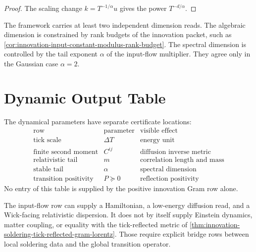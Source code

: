 \begin{proof}
The scaling change $k=T^{-1/\alpha}u$ gives the power
$T^{-d/\alpha}$.
\end{proof}

\begin{principle}
\label{prin:innovation-input-dynamics-dimension-split}
The framework carries at least two independent dimension reads. The
algebraic dimension is constrained by rank budgets of the innovation packet,
such as \autoref{cor:innovation-input-constant-modulus-rank-budget}. The
spectral dimension is controlled by the tail exponent $\alpha$ of the
input-flow multiplier. They agree only in the Gaussian case $\alpha=2$.
\end{principle}

\section{Dynamic Output Table}
\label{sec:innovation-input-dynamics-output-table}

\begin{principle}
\label{prin:innovation-input-dynamics-parameter-locations}
The dynamical parameters have separate certificate locations:
$$
\begin{array}{c|c|c}
\text{row} & \text{parameter} & \text{visible effect}\\
\hline
\text{tick scale} & \Delta T & \text{energy unit}\\
\text{finite second moment} & C^{ij} & \text{diffusion inverse metric}\\
\text{relativistic tail} & m & \text{correlation length and mass}\\
\text{stable tail} & \alpha & \text{spectral dimension}\\
\text{transition positivity} & P\succeq0 & \text{reflection positivity}
\end{array}
$$
No entry of this table is supplied by the positive innovation Gram row
alone.
\end{principle}

\begin{principle}
\label{prin:innovation-input-dynamics-propagation-boundary}
The input-flow row can supply a Hamiltonian, a low-energy diffusion read,
and a Wick-facing relativistic dispersion. It does not by itself supply
Einstein dynamics, matter coupling, or equality with the tick-reflected
metric of \autoref{thm:innovation-soldering-tick-reflected-gram-lorentz}.
Those require explicit bridge rows between local soldering data and the
global transition operator.
\end{principle}


